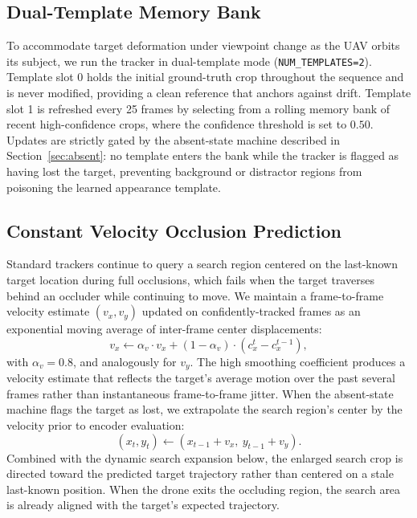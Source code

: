 \documentclass[10pt,twocolumn,letterpaper]{article}
\begin{document}
\subsection{Dual-Template Memory Bank}

To accommodate target deformation under viewpoint change as the UAV orbits its subject, we run the tracker in dual-template mode (\texttt{NUM\_TEMPLATES=2}). Template slot 0 holds the initial ground-truth crop throughout the sequence and is never modified, providing a clean reference that anchors against drift. Template slot 1 is refreshed every 25 frames by selecting from a rolling memory bank of recent high-confidence crops, where the confidence threshold is set to $0.50$. Updates are strictly gated by the absent-state machine described in Section~\ref{sec:absent}: no template enters the bank while the tracker is flagged as having lost the target, preventing background or distractor regions from poisoning the learned appearance template.

\subsection{Constant Velocity Occlusion Prediction}

Standard trackers continue to query a search region centered on the last-known target location during full occlusions, which fails when the target traverses behind an occluder while continuing to move. We maintain a frame-to-frame velocity estimate $(v_x, v_y)$ updated on confidently-tracked frames as an exponential moving average of inter-frame center displacements:
\begin{equation}
v_x \leftarrow \alpha_v \cdot v_x + (1 - \alpha_v) \cdot (c_x^t - c_x^{t-1}),
\end{equation}
with $\alpha_v = 0.8$, and analogously for $v_y$. The high smoothing coefficient produces a velocity estimate that reflects the target's average motion over the past several frames rather than instantaneous frame-to-frame jitter. When the absent-state machine flags the target as lost, we extrapolate the search region's center by the velocity prior to encoder evaluation:
\begin{equation}
(x_t, y_t) \leftarrow (x_{t-1} + v_x,\ y_{t-1} + v_y).
\end{equation}
Combined with the dynamic search expansion below, the enlarged search crop is directed toward the predicted target trajectory rather than centered on a stale last-known position. When the drone exits the occluding region, the search area is already aligned with the target's expected trajectory.
\end{document}
